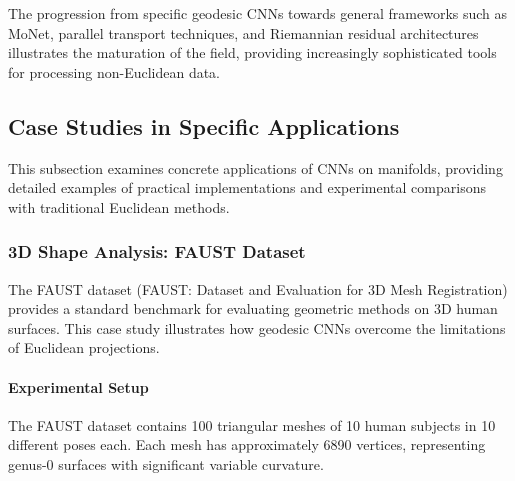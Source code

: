The progression from specific geodesic CNNs towards general frameworks such as MoNet, parallel transport techniques, and Riemannian residual architectures illustrates the maturation of the field, providing increasingly sophisticated tools for processing non-Euclidean data.

\subsection{Case Studies in Specific Applications}\label{subsec:casos_estudio_variedades}

This subsection examines concrete applications of CNNs on manifolds, providing detailed examples of practical implementations and experimental comparisons with traditional Euclidean methods.

\subsubsection{3D Shape Analysis: FAUST Dataset}\label{subsubsec:formas_3d_faust}

The FAUST dataset (FAUST: Dataset and Evaluation for 3D Mesh Registration) provides a standard benchmark for evaluating geometric methods on 3D human surfaces. This case study illustrates how geodesic CNNs overcome the limitations of Euclidean projections.

\paragraph{Experimental Setup}

The FAUST dataset contains 100 triangular meshes of 10 human subjects in 10 different poses each. Each mesh has approximately 6890 vertices, representing genus-0 surfaces with significant variable curvature.

